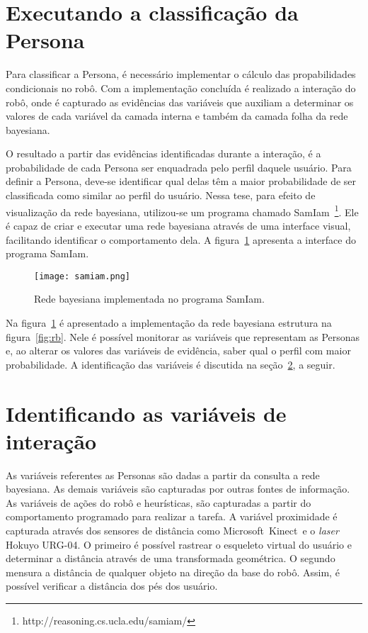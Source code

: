 \section{Executando a classificação da Persona}
\label{sec:consumo}
Para classificar a Persona, é necessário implementar o cálculo das propabilidades condicionais no robô. Com a implementação concluída é realizado a interação do robô, onde é capturado as evidências das variáveis que auxiliam a determinar os valores de cada variável da camada interna e também da camada folha da rede bayesiana.

O resultado a partir das evidências identificadas durante a interação, é a probabilidade de cada Persona ser enquadrada pelo perfil daquele usuário. Para definir a Persona, deve-se identificar qual delas têm a maior probabilidade de ser classificada como similar ao perfil do usuário. Nessa tese, para efeito de visualização da rede bayesiana, utilizou-se um programa chamado SamIam~\footnote{http://reasoning.cs.ucla.edu/samiam/}. Ele é capaz de criar e executar uma rede bayesiana através de uma interface visual, facilitando identificar o comportamento dela. A figura~\ref{fig:samiam} apresenta a interface do programa SamIam.

\begin{figure}[ht!]
	\centering
	\begin{minipage}{\textwidth}
		\caption{Rede bayesiana implementada no programa SamIam.}
		\texttt{[image: samiam.png]}
		\label{fig:samiam}
	\end{minipage}
\end{figure}

Na figura~\ref{fig:samiam} é apresentado a implementação da rede bayesiana estrutura na figura~\ref{fig:rb}. Nele é possível monitorar as variáveis que representam as Personas e, ao alterar os valores das variáveis de evidência, saber qual o perfil com maior probabilidade. A identificação das variáveis é discutida na seção~\ref{sec:idvariavel}, a seguir.

\section{Identificando as variáveis de interação}
\label{sec:idvariavel}
As variáveis referentes as Personas são dadas a partir da consulta a rede bayesiana. As demais variáveis são capturadas por outras fontes de informação. As variáveis de ações do robô e heurísticas, são capturadas a partir do comportamento programado para realizar a tarefa. A variável proximidade é capturada através dos sensores de distância como Microsoft\textregistered\ Kinect\textregistered\ e o \emph{laser} Hokuyo URG-04. O primeiro é possível rastrear o esqueleto virtual do usuário e determinar a distância através de uma transformada geométrica. O segundo mensura a distância de qualquer objeto na direção da base do robô. Assim, é possível verificar a distância dos pés dos usuário.

